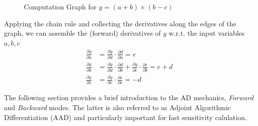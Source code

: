 \documentclass[12pt, a4paper]{report}
\begin{document}
\begin{center}
  \begin{figure}[hbt]
    \caption{Computation Graph for $y = (a + b) \times (b - c)$}
    \label{fig:cg}
  \end{figure}
\end{center}

Applying the chain rule and collecting the derivatives along the edges of the graph, we can assemble
the (forward) derivatives of $y$ w.r.t. the input variables $a, b, c$
\begin{align*}
  \frac{\partial y}{\partial a} &= \frac{\partial y}{\partial d} \cdot \frac{\partial d}{\partial a} = e\\ 
  \frac{\partial y}{\partial b} &= \frac{\partial y}{\partial d} \cdot \frac{\partial d}{\partial b} +  \frac{\partial y}{\partial e} \cdot \frac{\partial e}{\partial b} = e + d \\
  \frac{\partial y}{\partial c} &= \frac{\partial y}{\partial e} \cdot \frac{\partial e}{\partial c} = -d
  \end{align*}

The following section provides a brief introduction to the AD mechanics, {\em Forward} and {\em Backward} modes. The latter is also referred to as Adjoint Algorithmic Differentiation (AAD) and particularly important for fast sensitivity calulation.

\end{document}
